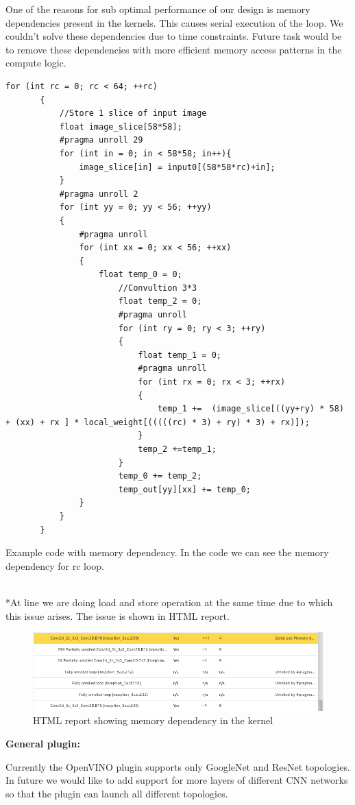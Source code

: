  One of the reasons for sub optimal performance of our design is memory dependencies present in the kernels. This causes serial execution of the loop. We couldn't solve these dependencies due to time constraints.  Future task would be to remove these dependencies with more efficient memory access patterns in the compute logic.  \begin{code}
 \begin{verbatim}
for (int rc = 0; rc < 64; ++rc)
       {
           //Store 1 slice of input image
           float image_slice[58*58];
           #pragma unroll 29
           for (int in = 0; in < 58*58; in++){
               image_slice[in] = input0[(58*58*rc)+in];
           }
           #pragma unroll 2
           for (int yy = 0; yy < 56; ++yy)
           {
               #pragma unroll
               for (int xx = 0; xx < 56; ++xx)
               {
                   float temp_0 = 0;
                       //Convultion 3*3
                       float temp_2 = 0;
                       #pragma unroll
                       for (int ry = 0; ry < 3; ++ry)
                       {
                           float temp_1 = 0;
                           #pragma unroll
                           for (int rx = 0; rx < 3; ++rx)
                           {
                               temp_1 +=  (image_slice[((yy+ry) * 58) + (xx) + rx ] * local_weight[(((((rc) * 3) + ry) * 3) + rx)]);
                           }
                           temp_2 +=temp_1;
                       }
                       temp_0 += temp_2;
                       temp_out[yy][xx] += temp_0;
               }
           }
       }
\end{verbatim}
\caption{Example code with memory dependency. In the code we can see the memory dependency for rc loop.}
\label{code:memory_dependency}
\end{code}\\*At line we are doing load and store operation at the same time due to which this issue arises. The issue is shown in HTML report.   \begin{figure}[H]
  \includegraphics[width=\textwidth,height=\textheight,keepaspectratio]{img/memory_dependency.png}
  \caption{HTML report showing memory dependency in the kernel}
  \label{fig:memory_dependency}
\end{figure}                                                                                    

  \item \textbf{General plugin: } \medskip
    
    Currently the OpenVINO plugin supports only GoogleNet and ResNet topologies. In future we would like to add support for more layers of different CNN networks so that the plugin can launch all different topologies.

       
  


